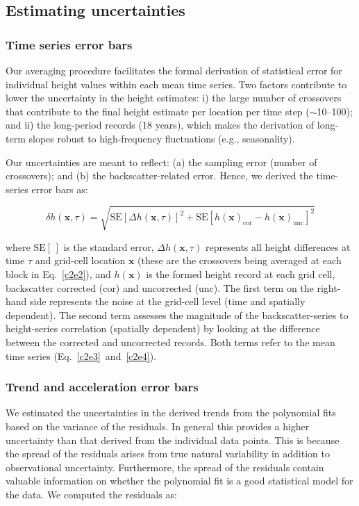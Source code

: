 \subsection{Estimating uncertainties}

\subsubsection{Time series error bars}

Our averaging procedure facilitates the formal derivation of statistical error for individual height values within each mean time series. Two factors contribute to lower the uncertainty in the height estimates: i) the large number of crossovers that contribute to the final height estimate per location per time step ($\sim$10--100); and ii) the long-period records (18 years), which makes the derivation of long-term slopes robust to high-frequency fluctuations (e.g., seasonality).

Our uncertainties are meant to reflect: (a) the sampling error (number of crossovers); and (b) the backscatter-related error. Hence, we derived the time-series error bars as:

\begin{equation}
  \delta h(\mathbf x,\tau) = \sqrt{
    \text{SE}[\Delta h(\mathbf x,\tau)]^2
    + \text{SE}[h(\mathbf x)_\text{cor} - h(\mathbf x)_\text{unc}]^2
    }
  \label{c2e7}
\end{equation}

\noindent
where $\text{SE}[\,]$ is the standard error, $\Delta h(\mathbf x,\tau)$ represents all height differences at time $\tau$ and grid-cell location $\mathbf x$ (these are the crossovers being averaged at each block in Eq.~\ref{c2e2}), and $h(\mathbf x)$ is the formed height record at each grid cell, backscatter corrected (cor) and uncorrected (unc). The first term on the right-hand side represents the noise at the grid-cell level (time and spatially dependent). The second term assesses the magnitude of the backscatter-series to height-series correlation (spatially dependent) by looking at the difference between the corrected and uncorrected records. Both terms refer to the mean time series (Eq.~\ref{c2e3}~and~\ref{c2e4}).

\subsubsection{Trend and acceleration error bars}

We estimated the uncertainties in the derived trends from the polynomial fits based on the variance of the residuals. In general this provides a higher uncertainty than that derived from the individual data points. This is because the spread of the residuals arises from true natural variability in addition to observational uncertainty. Furthermore, the spread of the residuals contain valuable information on whether the polynomial fit is a good statistical model for the data. We computed the residuals as:

